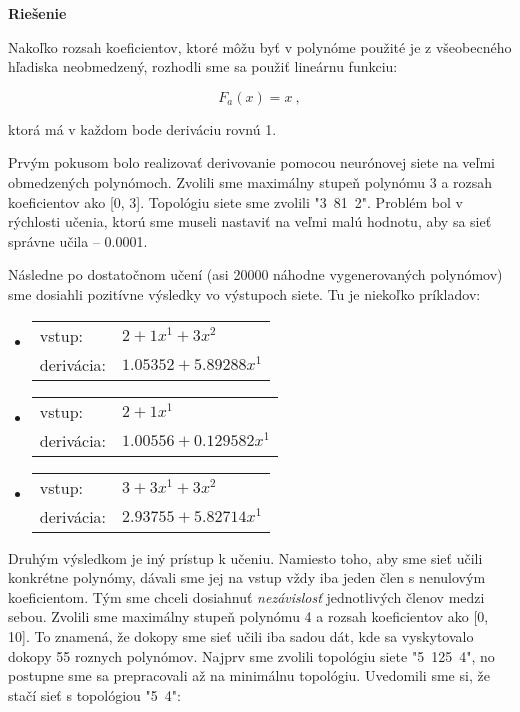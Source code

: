 \documentclass[12pt]{article}
\newcommand{\mysmallsection}[1]{\vspace{0.5cm}{\centering\large\textbf{#1}\\}\normalsize\vspace{0.5cm}}
\begin{document}
{\vspace*{0.5cm}\centering\textbf{Riešenie}\\}

Nakoľko rozsah koeficientov, ktoré môžu byť v polynóme použité je z všeobecného hľadiska neobmedzený, rozhodli sme sa použiť lineárnu funkciu: 

\begin{equation}
F_a(x)=x~,
\end{equation}

\noindent ktorá má v každom bode deriváciu rovnú 1.  

\mysmallsection{Výsledky}

Prvým pokusom bolo realizovať derivovanie pomocou neurónovej siete na veľmi obmedzených polynómoch. Zvolili sme maximálny stupeň polynómu 3 a rozsah koeficientov ako [0, 3]. Topológiu siete sme zvolili "3~81~2". Problém bol v rýchlosti učenia, ktorú sme museli nastaviť na veľmi malú hodnotu, aby sa sieť správne učila -- 0.0001.

Následne po dostatočnom učení (asi 20000 náhodne vygenerovaných polynómov) sme dosiahli pozitívne výsledky vo výstupoch siete. Tu je niekoľko príkladov:

\begin{itemize}
\item \begin{tabular}{ l l }
		vstup: & $2 + 1x^1 + 3x^2$\\
		derivácia: & $1.05352 + 5.89288x^1 $
	  \end{tabular}
\item \begin{tabular}{ l l }
		vstup: & $2 + 1x^1$\\
		derivácia: & $1.00556 + 0.129582x^1$
	  \end{tabular}
\item \begin{tabular}{ l l }
		vstup: & $3 + 3x^1 + 3x^2$\\
		derivácia: & $2.93755 + 5.82714x^1$
	  \end{tabular}
\end{itemize}

Druhým výsledkom je iný prístup k učeniu. Namiesto toho, aby sme sieť učili konkrétne polynómy, dávali sme jej na vstup vždy iba jeden člen s nenulovým koeficientom. Tým sme chceli dosiahnuť \textit{nezávislosť} jednotlivých členov medzi sebou. Zvolili sme maximálny stupeň polynómu 4 a rozsah koeficientov ako [0, 10]. To znamená, že dokopy sme sieť učili iba sadou dát, kde sa vyskytovalo dokopy 55 roznych polynómov. Najprv sme zvolili topológiu siete "5~125~4", no postupne sme sa prepracovali až na minimálnu topológiu. Uvedomili sme si, že stačí sieť s topológiou "5~4":
\end{document}
